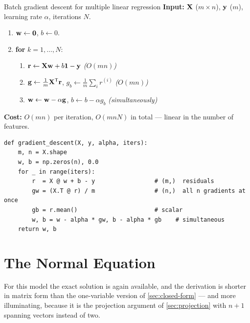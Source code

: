 \begin{algorithmbox}{Batch gradient descent for multiple linear regression}
\textbf{Input:} $\mathbf{X}$ ($m\times n$), $\mathbf{y}$ ($m$), learning rate $\alpha$,
iterations $N$.

\begin{enumerate}\setlength{\itemsep}{1pt}
  \item $\mathbf{w} \leftarrow \mathbf{0}$, \quad $b \leftarrow 0$.
  \item \textbf{for} $k = 1,\dots,N$:
  \begin{enumerate}\setlength{\itemsep}{1pt}
    \item $\mathbf{r} \leftarrow \mathbf{X}\mathbf{w} + b\mathbf{1} - \mathbf{y}$
          \hfill \emph{($O(mn)$)}
    \item $\mathbf{g} \leftarrow \frac{1}{m}\mathbf{X}^{\mathsf{T}}\mathbf{r}$,
          \quad $g_b \leftarrow \frac{1}{m}\sum_i r^{(i)}$
          \hfill \emph{($O(mn)$)}
    \item $\mathbf{w} \leftarrow \mathbf{w} - \alpha\mathbf{g}$,
          \quad $b \leftarrow b - \alpha g_b$ \hfill \emph{(simultaneously)}
  \end{enumerate}
\end{enumerate}

\textbf{Cost:} $O(mn)$ per iteration, $O(mnN)$ in total --- linear in the number
of features.
\end{algorithmbox}

\begin{lstlisting}[style=pythonml,caption={The whole algorithm. There is no loop
over examples and no loop over features.}]
def gradient_descent(X, y, alpha, iters):
    m, n = X.shape
    w, b = np.zeros(n), 0.0
    for _ in range(iters):
        r  = X @ w + b - y                 # (m,)  residuals
        gw = (X.T @ r) / m                 # (n,)  all n gradients at once
        gb = r.mean()                      # scalar
        w, b = w - alpha * gw, b - alpha * gb    # simultaneous
    return w, b
\end{lstlisting}

\section{The Normal Equation}
\label{sec:normal-equation}

For this model the exact solution is again available, and the derivation is
shorter in matrix form than the one-variable version of \cref{sec:closed-form}
--- and more illuminating, because it is the projection argument of
\cref{sec:projection} with $n+1$ spanning vectors instead of two.

